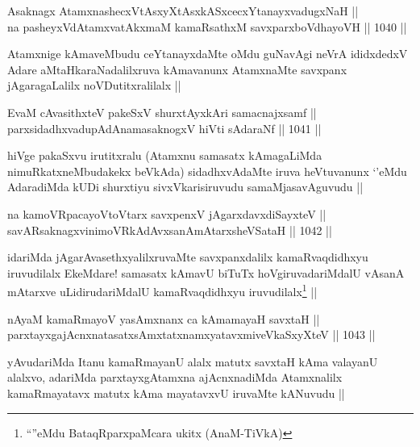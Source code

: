 \begin{shl}
Asaknagx AtamxnashecxVtAsxyXtAsxkASxcecxYtanayxvadugxNaH || \\
na pasheyxVdAtamxvatAkxmaM kamaRsathxM savxparxboVdhayoVH ||  1040 ||  
\end{shl}

\begin{artha}
Atamxnige kAmaveMbudu ceYtanayxdaMte oMdu guNavAgi neVrA ididxdedxV Adare aMtaHkaraNadalilxruva kAmavanunx AtamxnaMte savxpanx jAgaragaLalilx noVDutitxralilalx ||
\end{artha}

\begin{shl}
EvaM cAvasithxteV pakeSxV shurxtAyx\s kAri samacnajxsamf || \\
parxsidadhxvadupAdAnamasaknogxV hiVti sAdaraNf ||  1041 ||  
\end{shl}

\begin{artha}
hiVge pakaSxvu irutitxralu (Atamxnu samasatx kAmagaLiMda nimuRkatxneMbudakekx beVkAda) sidadhxvAdaMte iruva heVtuvanunx `\stext'eMdu AdaradiMda kUDi shurxtiyu sivxVkarisiruvudu samaMjasavAguvudu ||
\end{artha}

\begin{shl}
na kamoVRpacayoV\s toV\s tarx savxpenxV jAgarxdavxdiSayxteV || \\
savARsaknagxvinimoVRkAdAvxsanAmAtarxsheVSataH ||  1042 ||  
\end{shl}

\begin{artha}
idariMda jAgarAvasethxyalilxruvaMte savxpanxdalilx kamaRvaqdidhxyu iruvudilalx EkeMdare! samasatx kAmavU biTuTx hoVgiruvadariMdalU vAsanA mAtarxve uLidirudariMdalU kamaRvaqdidhxyu iruvudilalx\footnote{``\stext''eMdu BataqRparxpaMcara ukitx (AnaM-TiVkA)} ||
\end{artha}


\begin{shl}
nAyaM kamaRmayoV yasAmxnanx ca kAmamayaH savxtaH || \\
parxtayxgajAcnxnatasatxsAmxtatxnamxyatavxmiveVkaSxyXteV ||  1043 ||  
\end{shl}

\begin{artha}
yAvudariMda Itanu kamaRmayanU alalx matutx savxtaH kAma valayanU alalxvo, adariMda parxtayxgAtamxna ajAcnxnadiMda Atamxnalilx kamaRmayatavx matutx kAma mayatavxvU iruvaMte kANuvudu ||
\end{artha}

